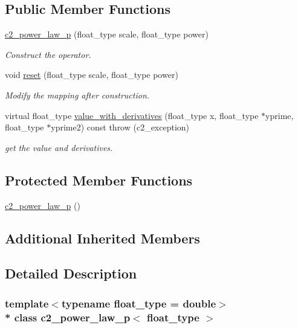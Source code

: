 \subsection*{Public Member Functions}
\begin{DoxyCompactItemize}
\item 
\hyperlink{classc2__power__law__p_aa94656e3e7b7fd9a78da1ff188258cc1}{c2\+\_\+power\+\_\+law\+\_\+p} (float\+\_\+type scale, float\+\_\+type power)
\begin{DoxyCompactList}\small\item\em Construct the operator. \end{DoxyCompactList}\item 
void \hyperlink{classc2__power__law__p_a2ac1227acd7b9bf34afd26efadc47ccb}{reset} (float\+\_\+type scale, float\+\_\+type power)
\begin{DoxyCompactList}\small\item\em Modify the mapping after construction. \end{DoxyCompactList}\item 
virtual float\+\_\+type \hyperlink{classc2__power__law__p_a21f0088450f7b7110a001f4960e95fa1}{value\+\_\+with\+\_\+derivatives} (float\+\_\+type x, float\+\_\+type $\ast$yprime, float\+\_\+type $\ast$yprime2) const   throw (c2\+\_\+exception)
\begin{DoxyCompactList}\small\item\em get the value and derivatives. \end{DoxyCompactList}\end{DoxyCompactItemize}
\subsection*{Protected Member Functions}
\begin{DoxyCompactItemize}
\item 
\hyperlink{classc2__power__law__p_a18229cec9c78b0d0a2c5e69a9e499bc8}{c2\+\_\+power\+\_\+law\+\_\+p} ()
\end{DoxyCompactItemize}
\subsection*{Additional Inherited Members}


\subsection{Detailed Description}
\subsubsection*{template$<$typename float\+\_\+type = double$>$\\*
class c2\+\_\+power\+\_\+law\+\_\+p$<$ float\+\_\+type $>$}


